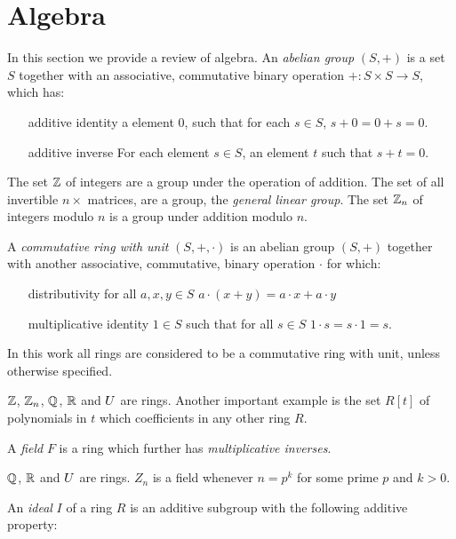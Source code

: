 
\section{Algebra}
In this section we provide a review of algebra. An \emph{abelian group} $(S,+)$ is a set $S$ together with an associative, commutative binary operation $+: S \times S \rightarrow S$, which has:
\begin{itemize}
\item[additive identity] a element $0$, such that for each $s \in S$, $s+0 = 0+s = 0$.
\item[additive inverse] For each element $s \in S$, an element $t$ such that $s+t = 0$.
\end{itemize}
\begin{example}
The set $\mathbb{Z}$ of integers are a group under the operation of addition. The set of all invertible $n \times $ matrices, are a group, the \emph{general linear group}.
The set $\mathbb{Z}_n$ of integers modulo $n$ is a group under addition modulo $n$.
\end{example}
A \emph{commutative ring with unit} $(S,+,\cdot)$ is an abelian group $(S,+)$  together with another associative, commutative, binary operation $\cdot$ for which:
\begin{itemize}
\item[distributivity] for all $a,x,y \in S$ $a \cdot (x + y)  = a \cdot x + a \cdot y$ 
\item[multiplicative identity] $1 \in S$ such that for all $s \in S$ $1 \cdot s = s \cdot 1 = s$. 
\end{itemize}
In this work all rings are considered to be a commutative ring with unit, unless otherwise specified.  
\begin{example}
$\mathbb{Z}$, $\mathbb{Z}_n$, $\mathbb{Q}$, $\mathbb{R}$ and $U$ are rings. Another important example is the set $R[t]$ of polynomials in $t$ which coefficients in any other ring $R$.
\end{example}
A \emph{field} $F$ is a ring which further has \emph{multiplicative inverses}.
\begin{example}
$\mathbb{Q}$, $\mathbb{R}$ and $U$ are rings.  $Z_n$ is a field whenever $n = p^k$ for some prime $p$ and $k > 0$.
\end{example}
An \emph{ideal} $I$ of a ring $R$ is an additive subgroup with the following additive property:
